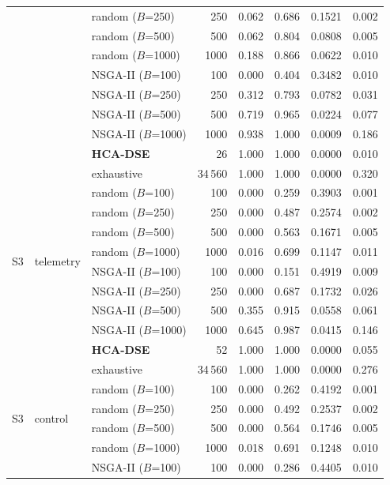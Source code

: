 \begin{tabular}{lllrrrrr}
 & & random ($B$=250) & 250 & 0.062 & 0.686 & 0.1521 & 0.002 \\
 & & random ($B$=500) & 500 & 0.062 & 0.804 & 0.0808 & 0.005 \\
 & & random ($B$=1000) & 1000 & 0.188 & 0.866 & 0.0622 & 0.010 \\
 & & NSGA-II ($B$=100) & 100 & 0.000 & 0.404 & 0.3482 & 0.010 \\
 & & NSGA-II ($B$=250) & 250 & 0.312 & 0.793 & 0.0782 & 0.031 \\
 & & NSGA-II ($B$=500) & 500 & 0.719 & 0.965 & 0.0224 & 0.077 \\
 & & NSGA-II ($B$=1000) & 1000 & 0.938 & 1.000 & 0.0009 & 0.186 \\
 & & \textbf{HCA-DSE} & 26 & 1.000 & 1.000 & 0.0000 & 0.010 \\
\midrule
\multirow{10}{*}{S3} & \multirow{10}{*}{telemetry} & exhaustive & 34\,560 & 1.000 & 1.000 & 0.0000 & 0.320 \\
 & & random ($B$=100) & 100 & 0.000 & 0.259 & 0.3903 & 0.001 \\
 & & random ($B$=250) & 250 & 0.000 & 0.487 & 0.2574 & 0.002 \\
 & & random ($B$=500) & 500 & 0.000 & 0.563 & 0.1671 & 0.005 \\
 & & random ($B$=1000) & 1000 & 0.016 & 0.699 & 0.1147 & 0.011 \\
 & & NSGA-II ($B$=100) & 100 & 0.000 & 0.151 & 0.4919 & 0.009 \\
 & & NSGA-II ($B$=250) & 250 & 0.000 & 0.687 & 0.1732 & 0.026 \\
 & & NSGA-II ($B$=500) & 500 & 0.355 & 0.915 & 0.0558 & 0.061 \\
 & & NSGA-II ($B$=1000) & 1000 & 0.645 & 0.987 & 0.0415 & 0.146 \\
 & & \textbf{HCA-DSE} & 52 & 1.000 & 1.000 & 0.0000 & 0.055 \\
\midrule
\multirow{10}{*}{S3} & \multirow{10}{*}{control} & exhaustive & 34\,560 & 1.000 & 1.000 & 0.0000 & 0.276 \\
 & & random ($B$=100) & 100 & 0.000 & 0.262 & 0.4192 & 0.001 \\
 & & random ($B$=250) & 250 & 0.000 & 0.492 & 0.2537 & 0.002 \\
 & & random ($B$=500) & 500 & 0.000 & 0.564 & 0.1746 & 0.005 \\
 & & random ($B$=1000) & 1000 & 0.018 & 0.691 & 0.1248 & 0.010 \\
 & & NSGA-II ($B$=100) & 100 & 0.000 & 0.286 & 0.4405 & 0.010 \\

\end{tabular}
